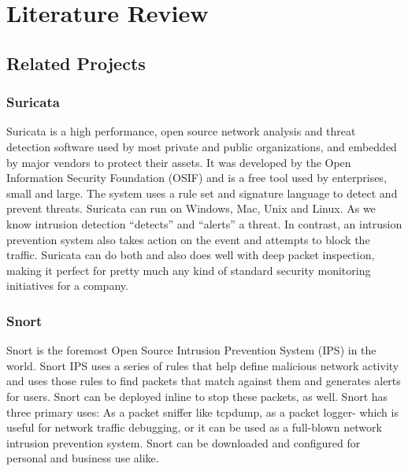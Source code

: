 \chapter{Literature Review}
\vspace{-18pt}
\section{Related Projects}
\vspace{-18pt}
\subsection{Suricata}
\vspace{-18pt}
Suricata is a high performance, open source network analysis and threat detection software used by most private and public organizations, and embedded by major vendors to protect their assets. It was developed by the Open Information Security Foundation (OSIF) and is a free tool used by enterprises, small and large. The system uses a rule set and signature language to detect and prevent threats. Suricata can run on Windows, Mac, Unix and Linux. As we know intrusion detection “detects” and “alerts” a threat. In contrast, an intrusion prevention system also takes action on the event and attempts to block the traffic. Suricata can do both and also does well with deep packet inspection, making it perfect for pretty much any kind of standard security monitoring initiatives for a company.
 \vspace{-10pt}
\subsection{Snort}
\vspace{-18pt}
Snort is the foremost Open Source Intrusion Prevention System (IPS) in the world. Snort IPS uses a series of rules that help define malicious network activity and uses those rules to find packets that match against them and generates alerts for users. Snort can be deployed inline to stop these packets, as well. Snort has three primary uses: As a packet sniffer like tcpdump, as a packet logger- which is useful for network traffic debugging, or it can be used as a full-blown network intrusion prevention system. Snort can be downloaded and configured for personal and business use alike.
\vspace{-10pt}

